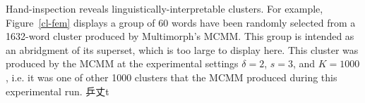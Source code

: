 


Hand-inspection reveals linguistically-interpretable clusters. For example, Figure~\ref{cl-fem} displays a group of 60 words have been randomly selected from a 1632-word cluster produced by Multimorph’s MCMM. This group is intended as an abridgment of its superset, which is too large to display here. This cluster was produced by the MCMM at the experimental settings $\delta = 2$, $s = 3$, and $K = 1000$, i.e. it was one of other 1000 clusters that the MCMM produced during this experimental run. 乒丈t

